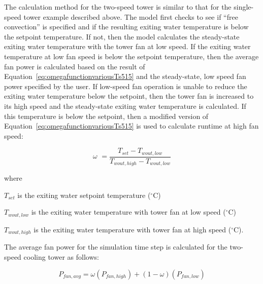 The calculation method for the two-speed tower is similar to that for the single-speed tower example described above. The model first checks to see if ``free convection'' is specified and if the resulting exiting water temperature is below the setpoint temperature. If not, then the model calculates the steady-state exiting water temperature with the tower fan at low speed. If the exiting water temperature at low fan speed is below the setpoint temperature, then the average fan power is calculated based on the result of Equation~\ref{eq:omegafunctionvariousTs515} and the steady-state, low speed fan power specified by the user. If low-speed fan operation is unable to reduce the exiting water temperature below the setpoint, then the tower fan is increased to its high speed and the steady-state exiting water temperature is calculated. If this temperature is below the setpoint, then a modified version of Equation~\ref{eq:omegafunctionvariousTs515} is used to calculate runtime at high fan speed:

\begin{equation}
\omega \,\, = \frac{{{T_{set}} - {T_{wout,low}}}}{{{T_{wout,high}} - {T_{wout,low}}}}
\end{equation}

where

\({T_{set}}\) is the exiting water setpoint temperature (\(^{\circ}\)C)

\({T_{wout,low}}\) is the exiting water temperature with tower fan at low speed (\(^{\circ}\)C)

\({T_{wout,high}}\) is the exiting water temperature with tower fan at high speed (\(^{\circ}\)C).

The average fan power for the simulation time step is calculated for the two-speed cooling tower as follows:

\begin{equation}
{P_{fan,avg}} = \omega ({P_{fan,high}}) + \left( {1 - \omega } \right)\left( {{P_{fan,low}}} \right)
\end{equation}

